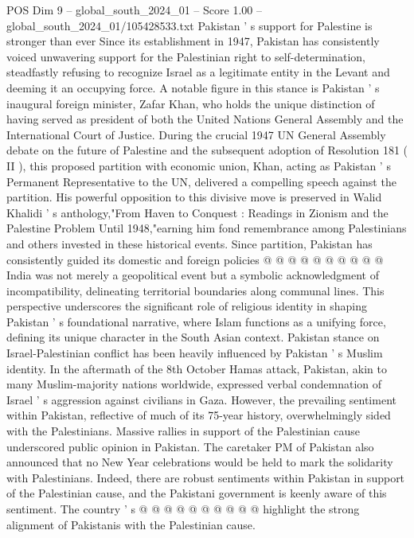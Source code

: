\begin{textsample}{POS Dim 9 – global\_south\_2024\_01 – Score 1.00 – global\_south\_2024\_01/105428533.txt}  \label{ex:f9_pos_021}
Pakistan ' s support for Palestine is stronger than ever Since its establishment in 1947, Pakistan has consistently voiced unwavering support for the Palestinian right to self-determination, steadfastly refusing to recognize Israel as a legitimate entity in the Levant and deeming it an occupying force.
A notable figure in this stance is Pakistan ' s inaugural foreign minister, Zafar Khan, who holds the unique distinction of having served as president of both the United Nations General Assembly and the International Court of Justice.
During the crucial 1947 UN General Assembly debate on the future of Palestine and the subsequent adoption of Resolution 181 ( II ), this proposed partition with economic union, Khan, acting as Pakistan ' s Permanent Representative to the UN, delivered a compelling speech against the partition.
His powerful opposition to this divisive move is preserved in Walid Khalidi ' s anthology,"From Haven to Conquest : Readings in Zionism and the Palestine Problem Until 1948,"earning him fond remembrance among Palestinians and others invested in these historical events.
Since partition, Pakistan has consistently guided its domestic and foreign policies @ @ @ @ @ @ @ @ @ @ India was not merely a geopolitical event but a symbolic acknowledgment of incompatibility, delineating territorial boundaries along communal lines.
This perspective underscores the significant role of religious identity in shaping Pakistan ' s foundational narrative, where Islam functions as a unifying force, defining its unique character in the South Asian context.
Pakistan stance on Israel-Palestinian conflict has been heavily influenced by Pakistan ' s Muslim identity.
In the aftermath of the 8th October Hamas attack, Pakistan, akin to many Muslim-majority nations worldwide, expressed verbal condemnation of Israel ' s aggression against civilians in Gaza.
However, the prevailing sentiment within Pakistan, reflective of much of its 75-year history, overwhelmingly sided with the Palestinians.
Massive rallies in support of the Palestinian cause underscored public opinion in Pakistan.
The caretaker PM of Pakistan also announced that no New Year celebrations would be held to mark the solidarity with Palestinians.
Indeed, there are robust sentiments within Pakistan in support of the Palestinian cause, and the Pakistani government is keenly aware of this sentiment.
The country ' s @ @ @ @ @ @ @ @ @ @ highlight the strong alignment of Pakistanis with the Palestinian cause.

\end{textsample}
